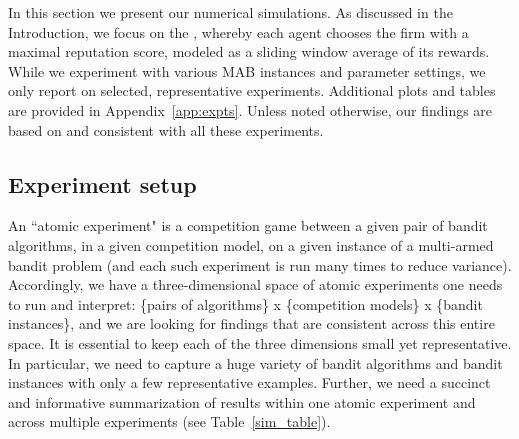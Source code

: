 \documentclass[../competing_bandits.tex]{subfiles}
\begin{document}
In this section we present our numerical simulations. As discussed in the Introduction, we focus on the \ExptsModel, whereby each agent chooses the firm with a maximal reputation score, modeled as a sliding window average of its rewards. While we experiment with various MAB instances and parameter settings, we only report on selected, representative experiments. Additional plots and tables are provided in Appendix~\ref{app:expts}. Unless noted otherwise, our findings are based on and consistent with all these experiments.



\subsection{Experiment setup}
\label{expts-prelims}



 An ``atomic experiment" is a competition game between a given pair of bandit algorithms, in a given competition model, on a given instance of a multi-armed bandit problem (and each such experiment is run many times to reduce variance). Accordingly, we have a three-dimensional space of atomic experiments one needs to run and interpret: \{pairs of algorithms\} x \{competition models\} x \{bandit instances\}, and we are looking for findings that are consistent across this entire space. It is essential to keep each of the three dimensions small yet representative. In particular, we need to capture a huge variety of bandit algorithms and bandit instances with only a few representative examples. Further, we need a succinct and informative summarization of results within one atomic experiment and across multiple experiments (\eg see Table~\ref{sim_table}).
\end{document}

